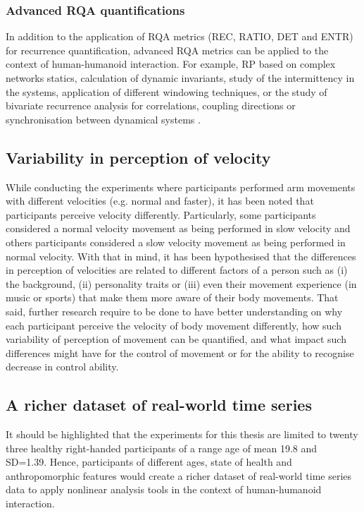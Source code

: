 \subsubsection*{Advanced RQA quantifications}
In addition to the application of RQA metrics (REC, RATIO, DET and ENTR) for 
recurrence quantification, advanced RQA metrics can be applied to 
the context of human-humanoid interaction. 
For example, RP based on complex networks statics, 
calculation of dynamic invariants, study of the intermittency in the systems, 
application of different windowing techniques, or 
the study of bivariate recurrence analysis for correlations, 
coupling directions or synchronisation between dynamical systems
\citep{marwan2007, marwan2015}.

\subsection*{Variability in perception of velocity}
While conducting the experiments where participants performed 
arm movements with different velocities (e.g. normal and faster),
it has been noted that participants perceive velocity differently.
Particularly, some participants considered a normal velocity movement 
as being performed in slow velocity and others participants considered 
a slow velocity movement as being performed in normal velocity. 
With that in mind, it has been hypothesised that the differences 
in perception of velocities are related to different factors 
of a person such as 
(i) the background, 
(ii) personality traits or
(iii) even their movement experience 
(in music or sports) that make them more aware of their body movements. 
That said, further research require to be done to have better 
understanding on why each participant perceive the velocity of 
body movement differently, how such variability of perception 
of movement can be quantified, and 
what impact such differences might have for the control of 
movement or for the ability to recognise decrease in control
ability. 

\subsection*{A richer dataset of real-world time series}
It should be highlighted that the experiments for this thesis are 
limited to twenty three healthy right-handed participants of a 
range age of mean 19.8 and SD=1.39.
Hence, participants of different ages, state of health and 
anthropomorphic features would create a richer dataset of 
real-world time series data to apply nonlinear analysis tools 
in the context of human-humanoid interaction. 

